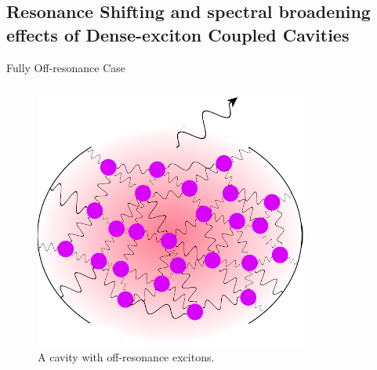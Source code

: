 \documentclass{beamer}
\begin{document}
\subsection[Resonance Shifting and spectral broadening effects]{Resonance Shifting and spectral broadening effects of Dense-exciton Coupled Cavities}
\begin{frame}{Fully Off-resonance Case}
\begin{columns}
\begin{figure}[htp]%
\centering
\begin{center}
\includegraphics[width=0.8\textwidth]{./Figs/Cavity_manyBackgroundDipoles}
\end{center}
\caption[off-resonance case.]{\fontsize{8}{-0.2}\selectfont A cavity with off-resonance excitons.}
\label{offresonance}
\end{figure}


\end{columns}
\end{frame}
\end{document}

